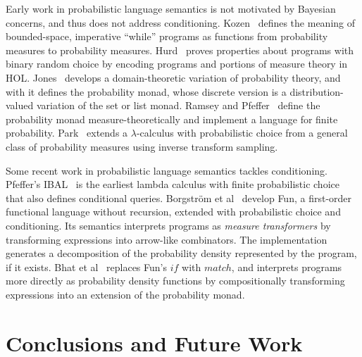 Early work in probabilistic language semantics is not motivated by Bayesian concerns, and thus does not address conditioning.
Kozen~\cite{cit:kozen-1979fcs-prob-programs-short} defines the meaning of bounded-space, imperative ``while'' programs as functions from probability measures to probability measures.
Hurd~\cite{cit:hurd-2002thesis} proves properties about programs with binary random choice by encoding programs and portions of measure theory in HOL.
Jones~\cite{cit:jones-1990thesis} develops a domain-theoretic variation of probability theory, and with it defines the probability monad, whose discrete version is a distribution-valued variation of the set or list monad.
Ramsey and Pfeffer~\cite{cit:ramsey-2002popl-stochastic-short} define the probability monad measure-theoretically and implement a language for finite probability.
Park~\cite{cit:park-2008toplas-prob} extends a $\lambda$-calculus with probabilistic choice from a general class of probability measures using inverse transform sampling.

Some recent work in probabilistic language semantics tackles conditioning. Pfeffer's IBAL~\cite{cit:pfeffer-2007chapter-ibal} is the earliest lambda calculus with finite probabilistic choice that also defines conditional queries.
Borgstr\"om et al~\cite{cit:borgstrom-2011esop-measure-transformer} develop Fun, a first-order functional language without recursion, extended with probabilistic choice and conditioning.
Its semantics interprets programs as \emph{measure transformers} by transforming expressions into arrow-like combinators.
The implementation generates a decomposition of the probability density represented by the program, if it exists.
Bhat et al~\cite{cit:bhat-2013etaps-densities} replaces Fun's $if$ with $match$, and interprets programs more directly as probability density functions by compositionally transforming expressions into an extension of the probability monad.



\section{Conclusions and Future Work}


